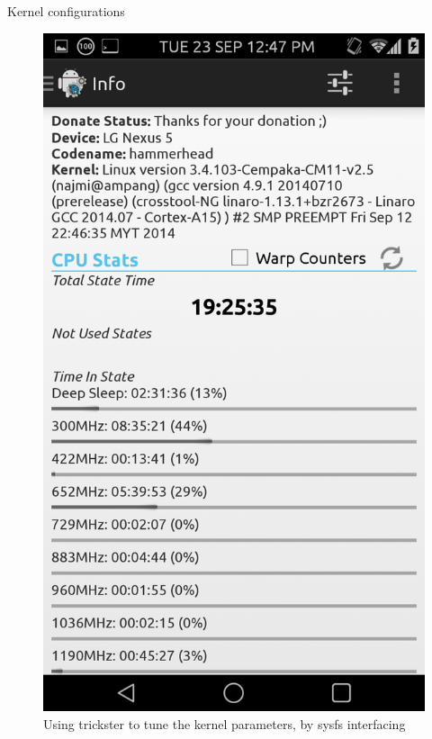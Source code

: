 \documentclass{beamer}
\begin{document}
 
  \begin{frame}{Kernel configurations}
   \begin{figure}
   \includegraphics[scale=.1]{trickster}    
   \caption {\tiny{Using trickster to tune the kernel parameters, by sysfs interfacing}}
    \end{figure}
  \end{frame}
\end{document}
